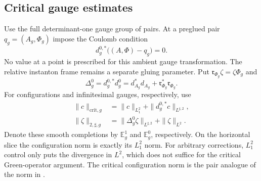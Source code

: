 \documentclass[11pt]{amsart}
\theoremstyle{definition}
\theoremstyle{remark}
\theoremstyle{plain}
\begin{document}
\subsection{Critical gauge estimates}
Use the full determinant-one gauge group of pairs.  At a preglued pair
$q_g=(A_g,\Phi_g)$ impose the Coulomb condition
\begin{equation}\label{eq:based-slice}
 d_g^{0,*}\bigl((A,\Phi)-q_g\bigr)=0.
\end{equation}
No value at a point is prescribed for this ambient gauge transformation.
The relative instanton frame remains a separate gluing parameter.
Put $\mathfrak r_{\Phi_g}\zeta=\zeta\Phi_g$ and
\begin{equation}\label{eq:pair-laplacian}
 \Delta_g^0=d_g^{0,*}d_g^0
 =d_{A_g}^*d_{A_g}+\mathfrak r_{\Phi_g}^*\mathfrak r_{\Phi_g}.
\end{equation}
For configurations and infinitesimal gauges, respectively, use
\begin{align}\label{eq:critical-configuration-norm}
 \|c\|_{\mathrm{crit},g}
 &=\|c\|_{L^2_1}+\|d_g^{0,*}c\|_{L^{\sharp,2}},\\
 \|\zeta\|_{2,\sharp,g}
 &=\|\Delta_g^0\zeta\|_{L^{\sharp,2}}+\|\zeta\|_{L^2}.
 \label{eq:critical-gauge-norm}
\end{align}
Denote these smooth completions by $\mathbb E_g^1$ and $\mathbb E_g^0$,
respectively.  On the horizontal slice the
configuration norm is exactly its $L^2_1$ norm.  For arbitrary corrections,
$L^2_1$ control only puts the divergence in $L^2$, which does not suffice
for the critical Green-operator argument.  The critical configuration
norm is the pair analogue of the norm in
\cite[Theorem~8.2]{FeehanCritical}.
\end{document}
